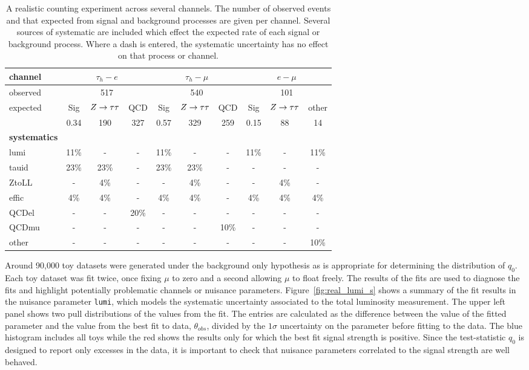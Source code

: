\begin{table}
\centering
\begin{tabular}{|l|c|c|c|c|c|c|c|c|c|}
\hline
\textbf{channel} & \multicolumn{3}{c|}{$\tau_{h}-e$} & \multicolumn{3}{|c|}{$\tau_{h}-\mu$} 
&\multicolumn{3}{c|}{$e-\mu$}   	\\ \hline
observed & \multicolumn{3}{c}{517} &\multicolumn{3}{|c|}{540} & \multicolumn{3}{c|}{101} \\ \hline
expected & Sig & $Z\rightarrow\tau\tau$ & QCD & Sig & $Z\rightarrow\tau\tau$ & QCD &Sig & $Z\rightarrow\tau\tau$ & other 		\\ \hline
	 & 0.34 & 190 & 327 &  0.57 & 329 & 259 & 0.15 & 88 & 14			\\ \hline
\hline
\textbf{systematics} & \multicolumn{9}{c|}{} \\ \hline
lumi	 & 11\% & - & - & 11\% & - & - & 11\% & - & 11\% 	\\ \hline 
tauid	 & 23\% & 23\% & - & 23\% & 23\% & - & - & - & -  	\\ \hline 
ZtoLL    & - & 4\% & - & - & 4\% & - & - & 4\% & - 		\\ \hline
effic    & 4\% & 4\%&  - & 4\% & 4\% & - & 4\% & 4\% & 4\%	\\ \hline  
QCDel	 & - & - & 20\% & - & - & - & - & - & - 		\\ \hline
QCDmu    & - & - & - & - & - & 10\% & - & - & -			\\ \hline
other    & - & - & - & - & - & - & - & - & 10\%			\\ \hline
\end{tabular}
\caption{A realistic counting experiment across several channels. 
The number of observed events and that expected from signal and background
processes are given per channel. Several sources of systematic are included 
which effect the expected rate of each signal or background process. 
Where a dash is entered, the systematic uncertainty has no effect on that 
process or channel. \label{tab:realanalysis}}
\end{table}

Around 90,000 toy datasets were generated under the background only hypothesis as is 
appropriate for determining the distribution of $q_{0}$. 
Each toy dataset was fit twice, once fixing $\mu$ to zero and a second allowing $\mu$ to float freely.
The results of the fits are used to diagnose the fits and highlight 
potentially problematic channels or nuisance parameters. 
Figure~\ref{fig:real_lumi_s} shows a summary of the fit results 
in the nuisance parameter \texttt{lumi}, 
which models the systematic uncertainty associated to the total luminosity measurement.
The upper left panel shows two pull distributions of the values from the fit. The entries are
calculated as the difference between the value of the fitted parameter
and the value from the best fit to data, $\theta_{obs}$, divided by 
the $1\sigma$ uncertainty on the parameter before fitting to the data. 
The blue histogram includes all toys while the red shows the results
only for which the best fit signal strength is positive. Since the test-statistic $q_{0}$ 
is designed to report only excesses in the data,
it is important to check that nuisance parameters correlated to the signal 
strength are well behaved.

